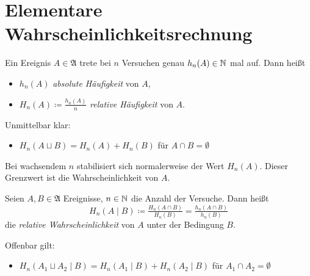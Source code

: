\documentclass{cheat-sheet}
\newcommand{\Alg}{\mathfrak{A}} %
\begin{document}
\section{Elementare Wahrscheinlichkeitsrechnung}


\begin{defn}
  Ein Ereignis $A \in \Alg$ trete bei $n$ Versuchen genau $h_n(A) \in \mathbb{N}$ mal auf. Dann heißt
  \begin{itemize}
    \item $h_n(A)$ \emph{absolute Häufigkeit} von $A$,
    \item $H_n(A) \coloneqq \tfrac{h_n(A)}{n}$ \emph{relative Häufigkeit} von $A$.
  \end{itemize}
\end{defn}

\begin{bem}
  Unmittelbar klar:
  \begin{itemize}
    \item $H_n(A \sqcup B) = H_n(A) + H_n(B)$ für $A \cap B = \emptyset$
  \end{itemize}
\end{bem}

\begin{bem}
  Bei wachsendem $n$ stabilisiert sich normalerweise der Wert $H_n(A)$. Dieser Grenzwert ist die Wahrscheinlichkeit von $A$.
\end{bem}



\begin{defn}
  Seien $A, B \in \Alg$ Ereignisse, $n \in \mathbb{N}$ die Anzahl der Versuche. Dann heißt
  \[ H_n(A \mid B) \coloneqq \tfrac{H_n(A \cap B)}{H_n(B)} = \tfrac{h_n(A \cap B)}{h_n(B)} \]
  die \emph{relative Wahrscheinlichkeit} von $A$ unter der Bedingung $B$.
\end{defn}

\begin{bem}
  Offenbar gilt:
  \begin{itemize}
    \item $H_n(A_1 \sqcup A_2 \mid B) = H_n(A_1 \mid B) + H_n(A_2 \mid B)$ für $A_1 \cap A_2 = \emptyset$
  \end{itemize}
\end{bem}
\end{document}
